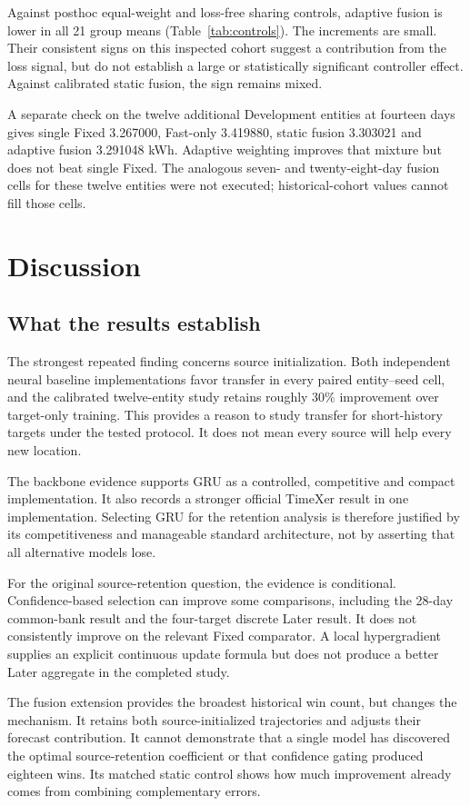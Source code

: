 \documentclass[pdflatex,iicol,sn-mathphys-num]{sn-jnl}
\begin{document}
Against posthoc equal-weight and loss-free sharing controls, adaptive fusion is lower in all 21 group means (Table~\ref{tab:controls}). The increments are small. Their consistent signs on this inspected cohort suggest a contribution from the loss signal, but do not establish a large or statistically significant controller effect. Against calibrated static fusion, the sign remains mixed.

A separate check on the twelve additional Development entities at fourteen days gives single Fixed 3.267000, Fast-only 3.419880, static fusion 3.303021 and adaptive fusion 3.291048 kWh. Adaptive weighting improves that mixture but does not beat single Fixed. The analogous seven- and twenty-eight-day fusion cells for these twelve entities were not executed; historical-cohort values cannot fill those cells.

\section{Discussion}
\subsection{What the results establish}
The strongest repeated finding concerns source initialization. Both independent neural baseline implementations favor transfer in every paired entity--seed cell, and the calibrated twelve-entity study retains roughly 30\% improvement over target-only training. This provides a reason to study transfer for short-history targets under the tested protocol. It does not mean every source will help every new location.

The backbone evidence supports GRU as a controlled, competitive and compact implementation. It also records a stronger official TimeXer result in one implementation. Selecting GRU for the retention analysis is therefore justified by its competitiveness and manageable standard architecture, not by asserting that all alternative models lose.

For the original source-retention question, the evidence is conditional. Confidence-based selection can improve some comparisons, including the 28-day common-bank result and the four-target discrete Later result. It does not consistently improve on the relevant Fixed comparator. A local hypergradient supplies an explicit continuous update formula but does not produce a better Later aggregate in the completed study.

The fusion extension provides the broadest historical win count, but changes the mechanism. It retains both source-initialized trajectories and adjusts their forecast contribution. It cannot demonstrate that a single model has discovered the optimal source-retention coefficient or that confidence gating produced eighteen wins. Its matched static control shows how much improvement already comes from combining complementary errors.
\end{document}
